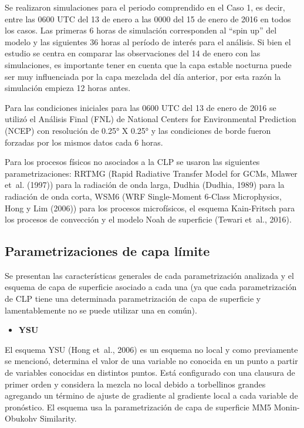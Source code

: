 \documentclass[12pt,spanish,oneside]{book}
\providecommand{\tightlist}{%
  \setlength{\itemsep}{0pt}\setlength{\parskip}{0pt}}
\begin{document}
Se realizaron simulaciones para el periodo comprendido en el Caso 1, es
decir, entre las 0600 UTC del 13 de enero a las 0000 del 15 de enero de
2016 en todos los casos. Las primeras 6 horas de simulación corresponden
al ``spin up'' del modelo y las siguientes 36 horas al período de
interés para el análisis. Si bien el estudio se centra en comparar las
observaciones del 14 de enero con las simulaciones, es importante tener
en cuenta que la capa estable nocturna puede ser muy influenciada por la
capa mezclada del día anterior, por esta razón la simulación empieza 12
horas antes.

Para las condiciones iniciales para las 0600 UTC del 13 de enero de 2016
se utilizó el Análisis Final (FNL) de National Centers for Environmental
Prediction (NCEP) con resolución de 0.25° X 0.25° y las condiciones de
borde fueron forzadas por los mismos datos cada 6 horas.

Para los procesos físicos no asociados a la CLP se usaron las siguientes
parametrizaciones: RRTMG (Rapid Radiative Transfer Model for GCMs,
Mlawer et~al. (1997)) para la radiación de onda larga, Dudhia (Dudhia,
1989) para la radiación de onda corta, WSM6 (WRF Single-Moment 6-Class
Microphysics, Hong y Lim (2006)) para los procesos microfísicos, el
esquema Kain-Fritsch para los procesos de convección y el modelo Noah de
superficie (Tewari et~al., 2016).

\subsection{Parametrizaciones de capa
límite}\label{parametrizaciones-de-capa-limite}

Se presentan las características generales de cada parametrización
analizada y el esquema de capa de superficie asociado a cada una (ya que
cada parametrización de CLP tiene una determinada parametrización de
capa de superficie y lamentablemente no se puede utilizar una en común).

\begin{itemize}
\tightlist
\item
  \textbf{YSU}
\end{itemize}

El esquema YSU (Hong et~al., 2006) es un esquema no local y como
previamente se mencionó, determina el valor de una variable no conocida
en un punto a partir de variables conocidas en distintos puntos. Está
configurado con una clausura de primer orden y considera la mezcla no
local debido a torbellinos grandes agregando un término de ajuste de
gradiente al gradiente local a cada variable de pronóstico. El esquema
usa la parametrización de capa de superficie MM5 Monin-Obukohv
Similarity.
\end{document}
